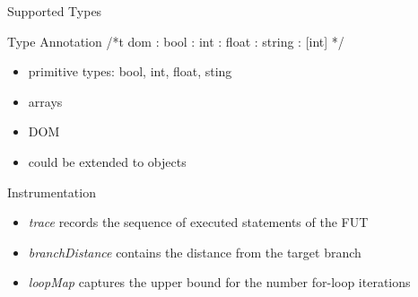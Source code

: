 \documentclass{beamer}
\begin{document}
\begin{frame}{Supported Types}
\begin{block}{Type Annotation}
  /*t dom : bool : int : float : string : [int]  */
\end{block}
\begin{itemize}
\item primitive types: bool, int, float, sting
\item arrays
\item DOM
\item could be extended to objects
\end{itemize}
\end{frame}

\begin{frame}{Instrumentation}
\begin{itemize}
  \item \emph{trace} records the sequence of executed statements of the FUT
  \item \emph{branchDistance} contains the distance from the target branch
  \item \emph{loopMap} captures the upper bound for the number for-loop iterations  
\end{itemize}
\end{frame}
\end{document}
